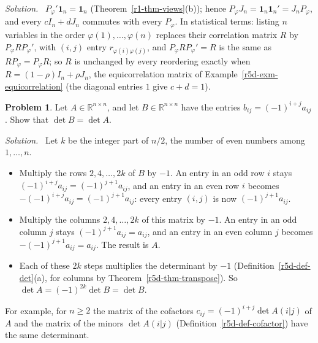 \documentclass[12pt]{article}
\newcommand{\R}{\mathbb R}
\newcommand{\one}{\mathbf 1}
\theoremstyle{definition}
\newtheorem{problem}{Problem}
\newenvironment{solution}{\par\noindent\textit{Solution.}\ }{\par\smallskip}
\begin{document}
\begin{solution}
\(P_\varphi'\one_n=\one_n\) (Theorem~\ref{r1-thm-views}(b)); hence \(P_\varphi J_n=\one_n\one_n'=J_nP_\varphi\), and every \(cI_n+dJ_n\) commutes with every
\(P_\varphi\). In statistical terms: listing \(n\) variables in the order \(\varphi(1),\dots,\varphi(n)\) replaces their
correlation matrix \(R\) by \(P_\varphi RP_\varphi'\), with \((i,j)\) entry \(r_{\varphi(i)\varphi(j)}\), and
\(P_\varphi RP_\varphi'=R\) is the same as \(RP_\varphi=P_\varphi R\); so \(R\) is unchanged by every reordering exactly when
\(R=(1-\rho)I_n+\rho J_n\), the equicorrelation matrix of Example~\ref{r5d-exm-equicorrelation} (the diagonal entries \(1\)
give \(c+d=1\)).
\end{solution}

\begin{problem}\label{r5d-ex-pr-checkerboard}
Let \(A\in\R^{n\times n}\), and let \(B\in\R^{n\times n}\) have the entries \(b_{ij}=(-1)^{i+j}a_{ij}\). Show that
\(\det B=\det A\).
\end{problem}
\begin{solution}
Let \(k\) be the integer part of \(n/2\), the number of even numbers among \(1,\dots,n\).
\begin{itemize}
\item Multiply the rows \(2,4,\dots,2k\) of \(B\) by \(-1\). An entry in an odd row \(i\) stays
\((-1)^{i+j}a_{ij}=(-1)^{j+1}a_{ij}\), and an entry in an even row \(i\) becomes \(-(-1)^{i+j}a_{ij}=(-1)^{j+1}a_{ij}\): every
entry \((i,j)\) is now \((-1)^{j+1}a_{ij}\).
\item Multiply the columns \(2,4,\dots,2k\) of this matrix by \(-1\). An entry in an odd column \(j\) stays
\((-1)^{j+1}a_{ij}=a_{ij}\), and an entry in an even column \(j\) becomes \(-(-1)^{j+1}a_{ij}=a_{ij}\). The result is \(A\).
\item Each of these \(2k\) steps multiplies the determinant by \(-1\) (Definition~\ref{r5d-def-det}(a), for columns by
Theorem~\ref{r5d-thm-transpose}). So \(\det A=(-1)^{2k}\det B=\det B\).
\end{itemize}
For example, for \(n\geqslant2\) the matrix of the cofactors \(c_{ij}=(-1)^{i+j}\det A(i|j)\) of \(A\) and the matrix of the
minors \(\det A(i|j)\) (Definition~\ref{r5d-def-cofactor}) have the same determinant.
\end{solution}
\end{document}
